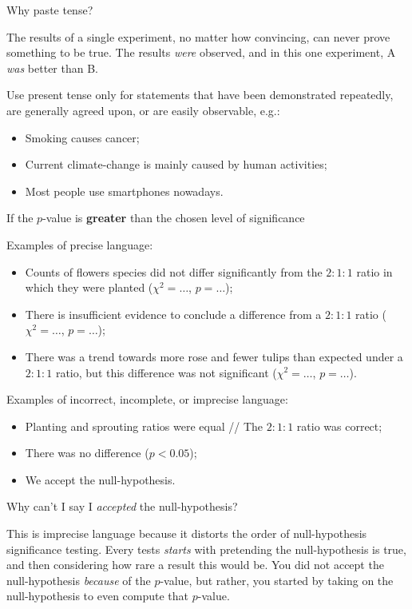 \documentclass[
]{book}
\providecommand{\tightlist}{%
  \setlength{\itemsep}{0pt}\setlength{\parskip}{0pt}}
\begin{document}
Why paste tense?

The results of a single experiment, no matter how convincing, can never prove something to be true. The results \emph{were} observed, and in this one experiment, A \emph{was} better than B.

Use present tense only for statements that have been demonstrated repeatedly, are generally agreed upon, or are easily observable, e.g.:

\begin{itemize}
\tightlist
\item
  Smoking causes cancer;
\item
  Current climate-change is mainly caused by human activities;
\item
  Most people use smartphones nowadays.
\end{itemize}

If the \(p\)-value is \textbf{greater} than the chosen level of significance

Examples of precise language:

\begin{itemize}
\tightlist
\item
  Counts of flowers species did not differ significantly from the \(2:1:1\) ratio in which they were planted (\(\chi^2 = \dots\), \(p = \dots\));
\item
  There is insufficient evidence to conclude a difference from a \(2:1:1\) ratio (\(\chi^2 = \dots\), \(p = \dots\));
\item
  There was a trend towards more rose and fewer tulips than expected under a \(2:1:1\) ratio, but this difference was not significant (\(\chi^2 = \dots\), \(p = \dots\)).
\end{itemize}

Examples of incorrect, incomplete, or imprecise language:

\begin{itemize}
\tightlist
\item
  Planting and sprouting ratios were equal // The \(2:1:1\) ratio was correct;
\item
  There was no difference (\(p < 0.05\));
\item
  We accept the null-hypothesis.
\end{itemize}

Why can't I say I \emph{accepted} the null-hypothesis?

This is imprecise language because it distorts the order of null-hypothesis significance testing. Every tests \emph{starts} with pretending the null-hypothesis is true, and then considering how rare a result this would be. You did not accept the null-hypothesis \emph{because} of the \(p\)-value, but rather, you started by taking on the null-hypothesis to even compute that \(p\)-value.
\end{document}
